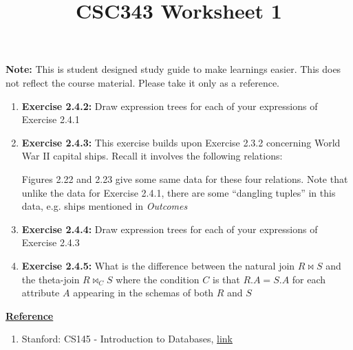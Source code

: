 \documentclass[12pt]{article}
\begin{document}
\title{CSC343 Worksheet 1}
\maketitle

\noindent \textbf{Note:} This is student designed study guide to make learnings easier.
This does not reflect the course material. Please take it only as a reference.

\begin{enumerate}[1.]
    \item \textbf{Exercise 2.4.2:} Draw expression trees for each of your expressions
    of Exercise 2.4.1

    \item \textbf{Exercise 2.4.3:} This exercise builds upon Exercise 2.3.2 concerning
    World War II capital ships. Recall it involves the following relations:


    Figures 2.22 and 2.23 give some same data for these four relations. Note that unlike
    the data for Exercise 2.4.1, there are some ``dangling tuples'' in this data,
    e.g. ships mentioned in \textit{Outcomes}

    \item \textbf{Exercise 2.4.4:} Draw expression trees for each of your expressions of
    Exercise 2.4.3

    \item \textbf{Exercise 2.4.5:} What is the difference between the natural join $R \bowtie S$ and the
    theta-join $R \bowtie_C S$ where the condition $C$ is that $R.A = S.A$ for
    each attribute $A$ appearing in the schemas of both $R$ and $S$
\end{enumerate}

\bigskip

\underline{\textbf{Reference}}

\bigskip

\begin{enumerate}[1)]
    \item Stanford: CS145 - Introduction to Databases, \href{http://infolab.stanford.edu/~ullman/fcdb/aut07/index.html}{link}
\end{enumerate}
\end{document}
